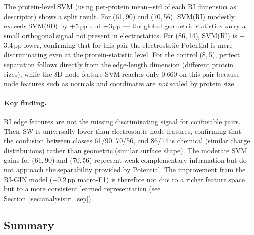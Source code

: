 The protein-level SVM (using per-protein mean+std of each RI dimension as
descriptor) shows a split result.
For (61,\,90) and (70,\,56), SVM(RI) modestly exceeds SVM(8D) by $+$5\,pp and
$+$3\,pp --- the global geometric statistics carry a small orthogonal signal not
present in electrostatics.
For (86,\,14), SVM(RI) is $-$3.4\,pp lower, confirming that for this pair the
electrostatic Potential is more discriminating even at the protein-statistic level.
For the control (8,\,5), perfect separation follows directly from the edge-length
dimension (different protein sizes), while the 8D node-feature SVM reaches only
0.660 on this pair because node features such as normals and coordinates are
\textit{not} scaled by protein size.

\paragraph{Key finding.}
RI edge features are not the missing discriminating signal for confusable pairs.
Their SW is universally lower than electrostatic node features, confirming
that the confusion between classes 61/90, 70/56, and 86/14 is chemical
(similar charge distributions) rather than geometric (similar surface shape).
The moderate SVM gains for (61,\,90) and (70,\,56) represent weak complementary
information but do not approach the separability provided by Potential.
The improvement from the RI-GIN model ($+$0.2\,pp macro-F1) is therefore not
due to a richer feature space but to a more consistent learned representation
(see Section~\ref{sec:analysis:ri_sep}).

\subsection{Summary}
\label{sec:analysis:summary}

